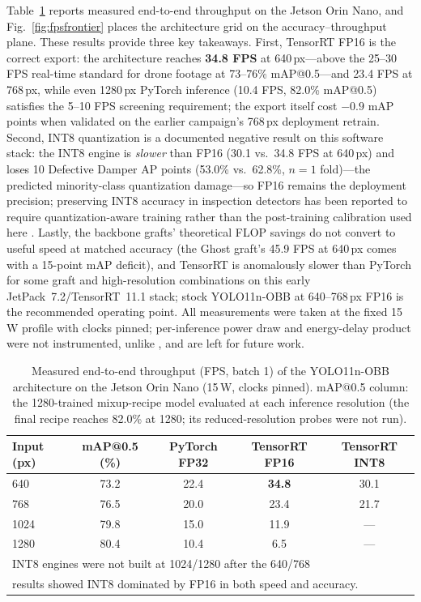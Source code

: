 \documentclass[conference]{IEEEtran}
\makeatletter
\newcommand{\dd}{Defective Damper}
\newcommand{\map}{mAP@0.5}
\makeatother
\begin{document}
Table~\ref{tab:jetson} reports measured end-to-end throughput on the Jetson Orin Nano, and Fig.~\ref{fig:fpsfrontier} places the architecture grid on the accuracy--throughput plane. These results provide three key takeaways. First, TensorRT FP16 is the correct export: the architecture reaches \textbf{34.8 FPS} at 640\,px---above the 25--30 FPS real-time standard for drone footage \cite{vazquez2026wildfire} at 73--76\% \map{}---and 23.4 FPS at 768\,px, while even 1280\,px PyTorch inference (10.4 FPS, 82.0\% \map{}) satisfies the 5--10 FPS screening requirement; the export itself cost $-0.9$ mAP points when validated on the earlier campaign's 768\,px deployment retrain. Second, INT8 quantization is a documented negative result on this software stack: the INT8 engine is \emph{slower} than FP16 (30.1 vs.\ 34.8 FPS at 640\,px) and loses 10 \dd{} AP points (53.0\% vs.\ 62.8\%, $n{=}1$ fold)---the predicted minority-class quantization damage---so FP16 remains the deployment precision; preserving INT8 accuracy in inspection detectors has been reported to require quantization-aware training rather than the post-training calibration used here \cite{farooq2026teyolov8}. Lastly, the backbone grafts' theoretical FLOP savings do not convert to useful speed at matched accuracy (the Ghost graft's 45.9 FPS at 640\,px comes with a 15-point mAP deficit), and TensorRT is anomalously slower than PyTorch for some graft and high-resolution combinations on this early JetPack~7.2/TensorRT~11.1 stack; stock YOLO11n-OBB at 640--768\,px FP16 is the recommended operating point. All measurements were taken at the fixed 15\,W profile with clocks pinned; per-inference power draw and energy-delay product were not instrumented, unlike \cite{vazquez2026wildfire}, and are left for future work.

\begin{table}[t]
\caption{Measured end-to-end throughput (FPS, batch 1) of the YOLO11n-OBB architecture on the Jetson Orin Nano (15\,W, clocks pinned). \map{} column: the 1280-trained mixup-recipe model evaluated at each inference resolution (the final recipe reaches 82.0\% at 1280; its reduced-resolution probes were not run).}
\label{tab:jetson}
\centering
\scriptsize
\setlength{\tabcolsep}{4pt}
\begin{tabular}{lcccc}
\toprule
Input (px) & \map{} (\%) & PyTorch FP32 & TensorRT FP16 & TensorRT INT8 \\
\midrule
640 & 73.2 & 22.4 & \textbf{34.8} & 30.1 \\
768 & 76.5 & 20.0 & 23.4 & 21.7 \\
1024 & 79.8 & 15.0 & 11.9 & --- \\
1280 & 80.4 & 10.4 & 6.5 & --- \\
\bottomrule
\multicolumn{5}{l}{INT8 engines were not built at 1024/1280 after the 640/768}\\
\multicolumn{5}{l}{results showed INT8 dominated by FP16 in both speed and accuracy.}
\end{tabular}
\end{table}
\end{document}
